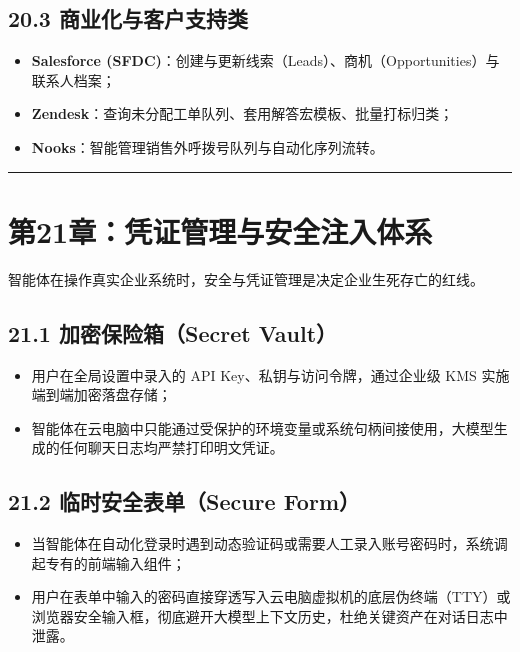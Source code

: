 \documentclass[10.5pt,a4paper,oneside]{report}
\providecommand{\tightlist}{\setlength{\itemsep}{0pt}\setlength{\parskip}{0pt}}
\begin{document}
\subsection{20.3
商业化与客户支持类}\label{ux5546ux4e1aux5316ux4e0eux5ba2ux6237ux652fux6301ux7c7b}

\begin{itemize}
\tightlist
\item
  \textbf{Salesforce
  (SFDC)}：创建与更新线索（Leads）、商机（Opportunities）与联系人档案；
\item
  \textbf{Zendesk}：查询未分配工单队列、套用解答宏模板、批量打标归类；
\item
  \textbf{Nooks}：智能管理销售外呼拨号队列与自动化序列流转。
\end{itemize}

\begin{center}\rule{0.5\linewidth}{0.5pt}\end{center}

\section{第21章：凭证管理与安全注入体系}\label{ux7b2c21ux7ae0ux51edux8bc1ux7ba1ux7406ux4e0eux5b89ux5168ux6ce8ux5165ux4f53ux7cfb}

智能体在操作真实企业系统时，安全与凭证管理是决定企业生死存亡的红线。

\subsection{21.1 加密保险箱（Secret
Vault）}\label{ux52a0ux5bc6ux4fddux9669ux7bb1secret-vault}

\begin{itemize}
\tightlist
\item
  用户在全局设置中录入的 API Key、私钥与访问令牌，通过企业级 KMS
  实施端到端加密落盘存储；
\item
  智能体在云电脑中只能通过受保护的环境变量或系统句柄间接使用，大模型生成的任何聊天日志均严禁打印明文凭证。
\end{itemize}

\subsection{21.2 临时安全表单（Secure
Form）}\label{ux4e34ux65f6ux5b89ux5168ux8868ux5355secure-form}

\begin{itemize}
\tightlist
\item
  当智能体在自动化登录时遇到动态验证码或需要人工录入账号密码时，系统调起专有的前端输入组件；
\item
  用户在表单中输入的密码直接穿透写入云电脑虚拟机的底层伪终端（TTY）或浏览器安全输入框，彻底避开大模型上下文历史，杜绝关键资产在对话日志中泄露。
\end{itemize}
\end{document}
